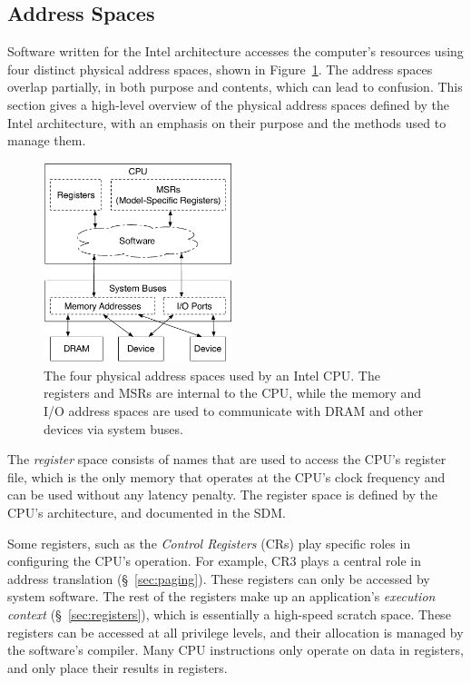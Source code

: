 \subsection{Address Spaces}
\label{sec:address_spaces}


Software written for the Intel architecture accesses the computer's resources
using four distinct physical address spaces, shown in
Figure~\ref{fig:address_spaces}. The address spaces overlap partially, in both
purpose and contents, which can lead to confusion. This section gives a
high-level overview of the physical address spaces defined by the Intel
architecture, with an emphasis on their purpose and the methods used to manage
them.

\begin{figure}[hbtp]
  \centering
  \includegraphics[width=55mm]{figures/address_spaces.pdf}
  \caption{
    The four physical address spaces used by an Intel CPU. The registers and
    MSRs are internal to the CPU, while the memory and I/O address spaces are
    used to communicate with DRAM and other devices via system buses.
  }
  \label{fig:address_spaces}
\end{figure}

The \textit{register} space consists of names that are used to access the CPU's
register file, which is the only memory that operates at the CPU's clock
frequency and can be used without any latency penalty. The register space is
defined by the CPU's architecture, and documented in the SDM.

Some registers, such as the \textit{Control Registers} (CRs) play specific
roles in configuring the CPU's operation. For example, CR3 plays a central role
in address translation (\S~\ref{sec:paging}). These registers can only be
accessed by system software. The rest of the registers make up an application's
\textit{execution context} (\S~\ref{sec:registers}), which is essentially a
high-speed scratch space. These registers can be accessed at all privilege
levels, and their allocation is managed by the software's compiler. Many CPU
instructions only operate on data in registers, and only place their results in
registers.

